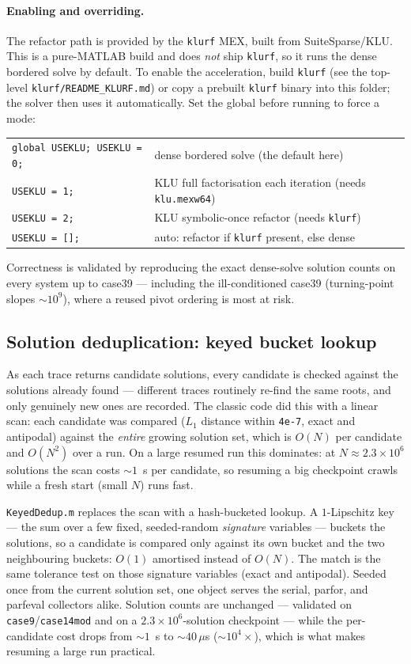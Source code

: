 \documentclass[11pt,a4paper]{article}
\newcommand{\code}[1]{\texttt{#1}}
\begin{document}
\paragraph{Enabling and overriding.}
The refactor path is provided by the \code{klurf} MEX, built from SuiteSparse/KLU. This is a
pure-MATLAB build and does \emph{not} ship \code{klurf}, so it runs the dense bordered solve
by default. To enable the acceleration, build \code{klurf} (see the top-level
\code{klurf/README_KLURF.md}) or copy a prebuilt \code{klurf} binary into this folder; the
solver then uses it automatically. Set the global before running to force a mode:
\begin{center}
\begin{tabular}{@{}ll@{}}
\toprule
\code{global USEKLU; USEKLU = 0;} & dense bordered solve (the default here)\\
\code{USEKLU = 1;}  & KLU full factorisation each iteration (needs \code{klu.mexw64})\\
\code{USEKLU = 2;}  & KLU symbolic-once refactor (needs \code{klurf})\\
\code{USEKLU = [];} & auto: refactor if \code{klurf} present, else dense\\
\bottomrule
\end{tabular}
\end{center}
Correctness is validated by reproducing the exact dense-solve solution counts on every
system up to case39 --- including the ill-conditioned case39 (turning-point slopes
$\sim\!10^9$), where a reused pivot ordering is most at risk.

\subsection{Solution deduplication: keyed bucket lookup}\label{sec:dedup}
As each trace returns candidate solutions, every candidate is checked against the solutions
already found --- different traces routinely re-find the same roots, and only genuinely new
ones are recorded. The classic code did this with a linear scan: each candidate was compared
($L_1$ distance within \code{4e-7}, exact and antipodal) against the \emph{entire} growing
solution set, which is $O(N)$ per candidate and $O(N^2)$ over a run. On a large resumed run
this dominates: at $N\approx2.3\times10^{6}$ solutions the scan costs ${\sim}1$~s per
candidate, so resuming a big checkpoint crawls while a fresh start (small $N$) runs fast.

\code{KeyedDedup.m} replaces the scan with a hash-bucketed lookup. A $1$-Lipschitz key --- the
sum over a few fixed, seeded-random \emph{signature} variables --- buckets the solutions, so a
candidate is compared only against its own bucket and the two neighbouring buckets: $O(1)$
amortised instead of $O(N)$. The match is the same tolerance test on those signature
variables (exact and antipodal). Seeded once from the current solution set, one object serves
the serial, parfor, and parfeval collectors alike. Solution counts are unchanged ---
validated on \code{case9}/\code{case14mod} and on a $2.3\times10^{6}$-solution checkpoint ---
while the per-candidate cost drops from ${\sim}1$~s to ${\sim}40\,\mu$s (${\sim}10^{4}\times$),
which is what makes resuming a large run practical.
\end{document}
